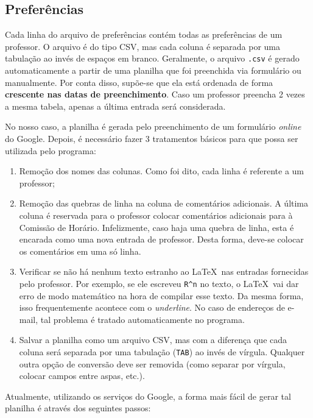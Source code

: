 \documentclass[a4paper, 12pt]{report}
\begin{document}
\subsection{Preferências} \label{conf:pref}

Cada linha do arquivo de preferências contém todas as preferências de
um professor. O arquivo é do tipo CSV, mas cada coluna é separada por
uma tabulação ao invés de espaços em branco. Geralmente, o arquivo
\texttt{.csv} é gerado automaticamente a partir de uma planilha que
foi preenchida via formulário ou manualmente. Por conta disso,
supõe-se que ela está ordenada de forma \textbf{crescente nas datas de
  preenchimento}. Caso um professor preencha 2 vezes a mesma tabela,
apenas a última entrada será considerada.

No nosso caso, a planilha é gerada pelo preenchimento de um formulário
\textit{online} do Google. Depois, é necessário fazer 3 tratamentos
básicos para que possa ser utilizada pelo programa:
\begin{enumerate}
\item Remoção dos nomes das colunas. Como foi dito, cada linha é
  referente a um professor;
\item Remoção das quebras de linha na coluna de comentários
  adicionais. A última coluna é reservada para o professor colocar
  comentários adicionais para à Comissão de Horário. Infelizmente,
  caso haja uma quebra de linha, esta é encarada como uma nova entrada
  de professor. Desta forma, deve-se colocar os comentários em uma só
  linha.
\item Verificar se não há nenhum texto estranho ao \LaTeX\ nas entradas
  fornecidas pelo professor. Por exemplo, se ele escreveu \verb+R^n+
  no texto, o \LaTeX\ vai dar erro de modo matemático na hora de
  compilar esse texto. Da mesma forma, isso frequentemente acontece
  com o \textit{underline}. No caso de endereços de e-mail, tal
  problema é tratado automaticamente no programa.
\item Salvar a planilha como um arquivo CSV, mas com a diferença que
  cada coluna será separada por uma tabulação (\texttt{TAB}) ao invés
  de vírgula. Qualquer outra opção de conversão deve ser removida
  (como separar por vírgula, colocar campos entre aspas, etc.).
\end{enumerate}

Atualmente, utilizando os serviços do Google, a forma mais fácil de
gerar tal planilha é através dos seguintes passos:
\end{document}

